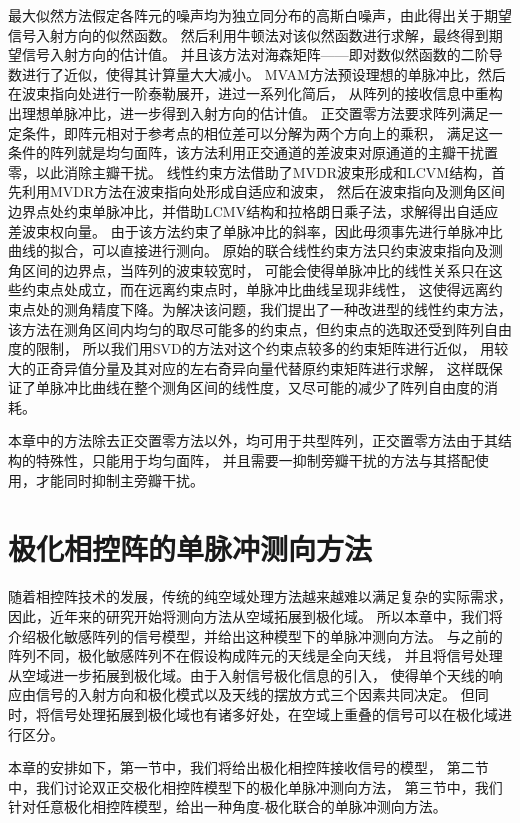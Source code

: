 \documentclass[master]{thesis-uestc}
\begin{document}
最大似然方法假定各阵元的噪声均为独立同分布的高斯白噪声，由此得出关于期望信号入射方向的似然函数。
然后利用牛顿法对该似然函数进行求解，最终得到期望信号入射方向的估计值。
并且该方法对海森矩阵——即对数似然函数的二阶导数进行了近似，使得其计算量大大减小。
MVAM方法预设理想的单脉冲比，然后在波束指向处进行一阶泰勒展开，进过一系列化简后，
从阵列的接收信息中重构出理想单脉冲比，进一步得到入射方向的估计值。
正交置零方法要求阵列满足一定条件，即阵元相对于参考点的相位差可以分解为两个方向上的乘积，
满足这一条件的阵列就是均匀面阵，该方法利用正交通道的差波束对原通道的主瓣干扰置零，以此消除主瓣干扰。
线性约束方法借助了MVDR波束形成和LCVM结构，首先利用MVDR方法在波束指向处形成自适应和波束，
然后在波束指向及测角区间边界点处约束单脉冲比，并借助LCMV结构和拉格朗日乘子法，求解得出自适应差波束权向量。
由于该方法约束了单脉冲比的斜率，因此毋须事先进行单脉冲比曲线的拟合，可以直接进行测向。
原始的联合线性约束方法只约束波束指向及测角区间的边界点，当阵列的波束较宽时，
可能会使得单脉冲比的线性关系只在这些约束点处成立，而在远离约束点时，单脉冲比曲线呈现非线性，
这使得远离约束点处的测角精度下降。为解决该问题，我们提出了一种改进型的线性约束方法，
该方法在测角区间内均匀的取尽可能多的约束点，但约束点的选取还受到阵列自由度的限制，
所以我们用SVD的方法对这个约束点较多的约束矩阵进行近似，
用较大的正奇异值分量及其对应的左右奇异向量代替原约束矩阵进行求解，
这样既保证了单脉冲比曲线在整个测角区间的线性度，又尽可能的减少了阵列自由度的消耗。

本章中的方法除去正交置零方法以外，均可用于共型阵列，正交置零方法由于其结构的特殊性，只能用于均匀面阵，
并且需要一抑制旁瓣干扰的方法与其搭配使用，才能同时抑制主旁瓣干扰。

\chapter{极化相控阵的单脉冲测向方法}
随着相控阵技术的发展，传统的纯空域处理方法越来越难以满足复杂的实际需求，因此，近年来的研究开始将测向方法从空域拓展到极化域。
所以本章中，我们将介绍极化敏感阵列的信号模型，并给出这种模型下的单脉冲测向方法。
与之前的阵列不同，极化敏感阵列不在假设构成阵元的天线是全向天线，
并且将信号处理从空域进一步拓展到极化域。由于入射信号极化信息的引入，
使得单个天线的响应由信号的入射方向和极化模式以及天线的摆放方式三个因素共同决定。
但同时，将信号处理拓展到极化域也有诸多好处，在空域上重叠的信号可以在极化域进行区分。

本章的安排如下，第一节中，我们将给出极化相控阵接收信号的模型，
第二节中，我们讨论双正交极化相控阵模型下的极化单脉冲测向方法，
第三节中，我们针对任意极化相控阵模型，给出一种角度-极化联合的单脉冲测向方法。
\end{document}
